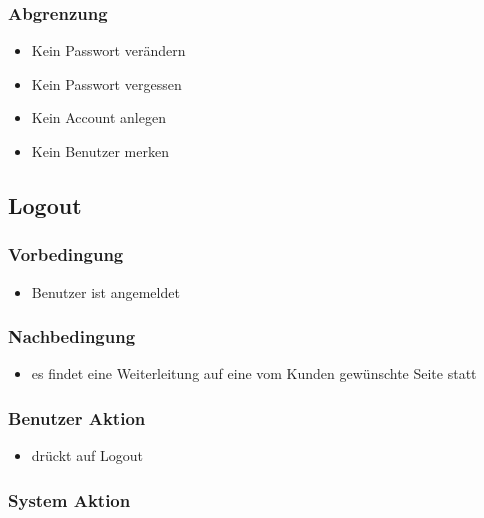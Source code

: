 \documentclass[a4paper,12pt]{article}
\begin{document}
\subsubsection{Abgrenzung}\label{abgrenzung}

\begin{itemize}
\item
  Kein Passwort verändern
\item
  Kein Passwort vergessen
\item
  Kein Account anlegen
\item
  Kein Benutzer merken
\end{itemize}

\subsection{Logout}\label{logout}

\subsubsection{Vorbedingung}\label{vorbedingung-1}

\begin{itemize}
\item
  Benutzer ist angemeldet
\end{itemize}

\subsubsection{Nachbedingung}\label{nachbedingung-1}

\begin{itemize}
\item
  es findet eine Weiterleitung auf eine vom Kunden gewünschte Seite
  statt
\end{itemize}

\subsubsection{Benutzer Aktion}\label{benutzer-aktion-1}

\begin{itemize}
\item
  drückt auf Logout
\end{itemize}

\subsubsection{System Aktion}\label{system-aktion-1}
\end{document}
